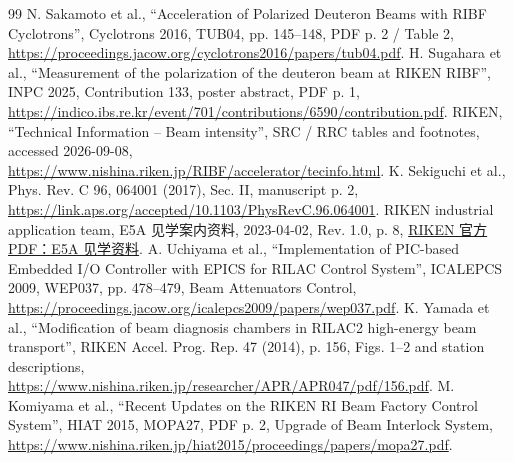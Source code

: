 \documentclass[UTF8,11pt,a4paper]{ctexart}
\begin{document}
\begin{thebibliography}{99}
 N. Sakamoto et al., ``Acceleration of Polarized Deuteron Beams with RIBF Cyclotrons'', Cyclotrons 2016, TUB04, pp. 145--148, PDF p. 2 / Table 2,\newline
\url{https://proceedings.jacow.org/cyclotrons2016/papers/tub04.pdf}.
 H. Sugahara et al., ``Measurement of the polarization of the deuteron beam at RIKEN RIBF'', INPC 2025, Contribution 133, poster abstract, PDF p. 1,\newline
\url{https://indico.ibs.re.kr/event/701/contributions/6590/contribution.pdf}.
 RIKEN, ``Technical Information -- Beam intensity'', SRC / RRC tables and footnotes, accessed 2026-09-08,\newline
\url{https://www.nishina.riken.jp/RIBF/accelerator/tecinfo.html}.
 K. Sekiguchi et al., Phys. Rev. C 96, 064001 (2017), Sec. II, manuscript p. 2,\newline
\url{https://link.aps.org/accepted/10.1103/PhysRevC.96.064001}.
 RIKEN industrial application team, E5A 见学案内资料, 2023-04-02, Rev. 1.0, p. 8,\newline
\href{https://ribf.riken.jp/sisetu-kyoyo/HIbeam/doc/E5Aadv_\%E8\%A6\%8B\%E5\%AD\%A6\%E6\%A1\%88\%E5\%86\%85\%E7\%94\%A8\%E8\%B3\%87\%E6\%96\%99.pdf}{RIKEN 官方 PDF：E5A 见学资料}.
 A. Uchiyama et al., ``Implementation of PIC-based Embedded I/O Controller with EPICS for RILAC Control System'', ICALEPCS 2009, WEP037, pp. 478--479, Beam Attenuators Control,\newline
\url{https://proceedings.jacow.org/icalepcs2009/papers/wep037.pdf}.
 K. Yamada et al., ``Modification of beam diagnosis chambers in RILAC2 high-energy beam transport'', RIKEN Accel. Prog. Rep. 47 (2014), p. 156, Figs. 1--2 and station descriptions,\newline
\url{https://www.nishina.riken.jp/researcher/APR/APR047/pdf/156.pdf}.
 M. Komiyama et al., ``Recent Updates on the RIKEN RI Beam Factory Control System'', HIAT 2015, MOPA27, PDF p. 2, Upgrade of Beam Interlock System,\newline
\url{https://www.nishina.riken.jp/hiat2015/proceedings/papers/mopa27.pdf}.


\end{thebibliography}
\end{document}
